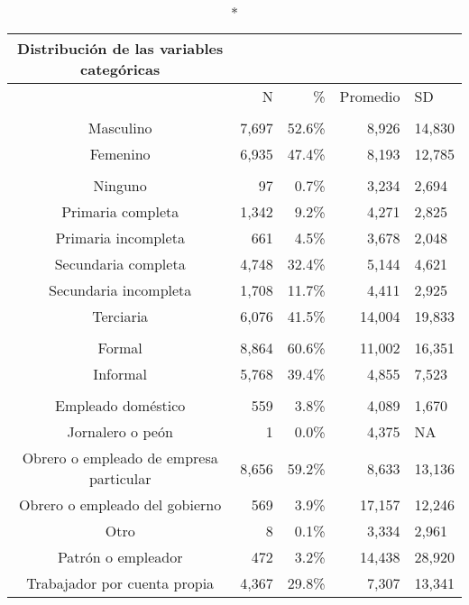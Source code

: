 \centering \footnotesize \setlength{\tabcolsep}{4pt} \renewcommand{\arraystretch}{0.8}
\begingroup
\fontsize{9.0pt}{8.5pt}\selectfont
\setlength{\LTpost}{0mm}
\begin{longtable}{crrrl}
\caption*{
{\large Distribución de las variables categóricas}
} \\ 
\toprule
  & N & \% & Promedio & SD \\ 
\midrule\addlinespace[2.5pt]
\multicolumn{5}{l}{{\bfseries Sexo}} \\[2.5pt] 
\midrule\addlinespace[2.5pt]
Masculino & 7,697 & 52.6\% & 8,926 & 14,830 \\ 
Femenino & 6,935 & 47.4\% & 8,193 & 12,785 \\ 
\midrule\addlinespace[2.5pt]
\multicolumn{5}{l}{{\bfseries Máximo nivel educativo}} \\[2.5pt] 
\midrule\addlinespace[2.5pt]
Ninguno &    97 &  0.7\% &  3,234 &  2,694 \\ 
Primaria completa & 1,342 &  9.2\% &  4,271 &  2,825 \\ 
Primaria incompleta &   661 &  4.5\% &  3,678 &  2,048 \\ 
Secundaria completa & 4,748 & 32.4\% &  5,144 &  4,621 \\ 
Secundaria incompleta & 1,708 & 11.7\% &  4,411 &  2,925 \\ 
Terciaria & 6,076 & 41.5\% & 14,004 & 19,833 \\ 
\midrule\addlinespace[2.5pt]
\multicolumn{5}{l}{{\bfseries Formalidad}} \\[2.5pt] 
\midrule\addlinespace[2.5pt]
Formal & 8,864 & 60.6\% & 11,002 & 16,351 \\ 
Informal & 5,768 & 39.4\% &  4,855 &  7,523 \\ 
\midrule\addlinespace[2.5pt]
\multicolumn{5}{l}{{\bfseries Posición ocupacional}} \\[2.5pt] 
\midrule\addlinespace[2.5pt]
Empleado doméstico &   559 &  3.8\% &  4,089 &  1,670 \\ 
Jornalero o peón &     1 &  0.0\% &  4,375 &     NA \\ 
Obrero o empleado de empresa particular & 8,656 & 59.2\% &  8,633 & 13,136 \\ 
Obrero o empleado del gobierno &   569 &  3.9\% & 17,157 & 12,246 \\ 
Otro &     8 &  0.1\% &  3,334 &  2,961 \\ 
Patrón o empleador &   472 &  3.2\% & 14,438 & 28,920 \\ 
Trabajador por cuenta propia & 4,367 & 29.8\% &  7,307 & 13,341 \\ 

\end{longtable}
